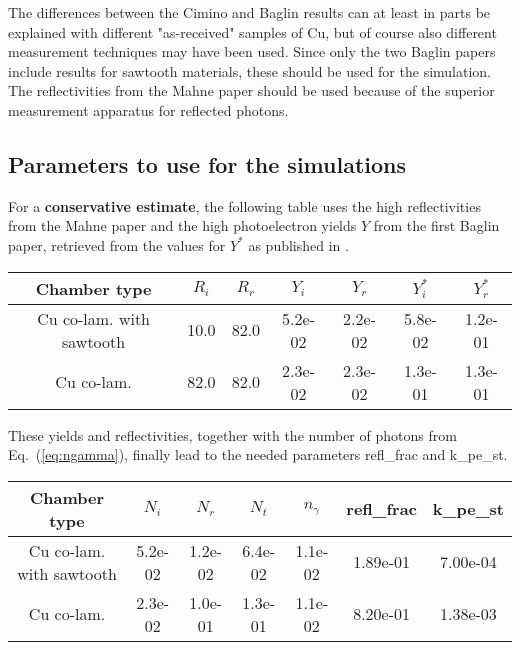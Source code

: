 The differences between the Cimino and Baglin results can at least in parts be explained with different "as-received" samples of Cu, but of course also different measurement techniques may have been used.
Since only the two Baglin papers include results for sawtooth materials, these should be used for the simulation.
The reflectivities from the Mahne paper should be used because of the superior measurement apparatus for reflected photons.

\subsection{Parameters to use for the simulations}
\label{sec:parameters}
For a \textbf{conservative estimate}, the following table uses the high reflectivities from the Mahne paper and the high photoelectron yields $Y$ from the first Baglin paper, retrieved from the values for $Y^*$ as published in \cite{baglin}.

\begin{tabular}{c|cccc|cc}
Chamber type & $R_i$ & $R_r$ & $Y_i$ & $Y_r$ & $Y_i^*$ & $Y_r^*$  \\ \hline 
Cu co-lam. with sawtooth &10.0 &82.0 &5.2e-02 &2.2e-02& 5.8e-02 &1.2e-01 \\
Cu co-lam. &82.0 &82.0 &2.3e-02 &2.3e-02& 1.3e-01 &1.3e-01 \\
\end{tabular}

These yields and reflectivities, together with the number of photons from Eq.~(\ref{eq:ngamma}), finally lead to the needed parameters refl\_frac and k\_pe\_st.

\begin{tabular}{c|ccc|c|cc}
Chamber type & $N_i$ & $N_r$ & $N_t$ & $n_\gamma$ & refl\_frac & k\_pe\_st \\ \hline 
Cu co-lam. with sawtooth& 5.2e-02 &1.2e-02 &6.4e-02 &1.1e-02 &1.89e-01 &7.00e-04\\
Cu co-lam.& 2.3e-02 &1.0e-01 &1.3e-01 &1.1e-02 &8.20e-01 &1.38e-03\\
\end{tabular}



